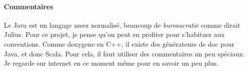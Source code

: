 \documentclass{article}
\begin{document}
\paragraph{Commentaires}
Le Java est un langage assez normalisé, beaucoup de \textit{bureaucratie} comme dirait Julius. Pour ce projet, je pense qu'on peut en profiter pour s'habituer aux conventions. Comme doxygene en C++, il existe des générateurs de doc pour Java, et donc Scala. Pour cela, il faut utiliser des commentaires un peu spéciaux. Je regarde sur internet en ce moment même pour en savoir un peu plus.
\end{document}
